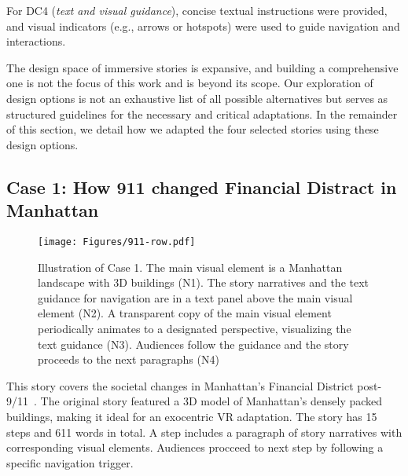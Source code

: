 For {DC4} (\textit{text and visual guidance}), concise textual instructions were provided, and visual indicators (e.g., arrows or hotspots) were used to guide navigation and interactions.


The design space of immersive stories is expansive, and building a comprehensive one is not the focus of this work and is beyond its scope. 
Our exploration of design options is not an exhaustive list of all possible alternatives but serves as structured guidelines for the necessary and critical adaptations. 
In the remainder of this section, we detail how we adapted the four selected stories using these design options.

\subsection{Case 1: How 911 changed Financial Distract in Manhattan}
\label{subsec:case1}
\begin{figure*}[t]
\centering
  \texttt{[image: Figures/911-row.pdf]}
  \caption{Illustration of Case 1. The main visual element is a Manhattan landscape with 3D buildings (N1). The story narratives and the text guidance for navigation are in a text panel above the main visual element (N2). A transparent copy of the main visual element periodically animates to a designated perspective, visualizing the text guidance (N3). Audiences follow the guidance and the story proceeds to the next paragraphs (N4)}
  \label{fig:911-VR}
\end{figure*}
This story covers the societal changes in Manhattan’s Financial District post-9/11~\cite{911}. The original story featured a 3D model of Manhattan’s densely packed buildings, making it ideal for an exocentric VR adaptation. {The story has 15 steps and 611 words in total. A step includes a paragraph of story narratives with corresponding visual elements. Audiences procceed to next step by following a specific navigation trigger.}

